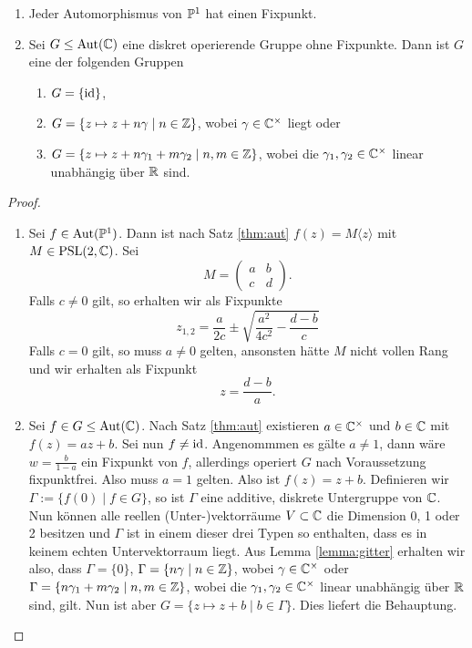 \begin{lemma}
  \label{lemma:deck-pc}
  \begin{enumerate}
  \item Jeder Automorphismus von $\P^1$ hat einen Fixpunkt.
  \item Sei $G \leq \Aut(\C)$ eine diskret operierende Gruppe ohne
    Fixpunkte. Dann ist $G$ eine der folgenden Gruppen
    \begin{enumerate}
    \item $G = \{\id\}$,
    \item $G = \{ z \mapsto z + n \gamma \mid n \in \Z\}$, wobei $\gamma
      \in \C^\times$ liegt oder
    \item $G = \{z \mapsto z + n \gamma_1 + m \gamma_2 \mid n,m \in
      \Z\}$, wobei die $\gamma_1, \gamma_2 \in \C^\times$ linear
      unabhängig über $\R$ sind.
    \end{enumerate}
  \end{enumerate}
\end{lemma}

\begin{proof}
  \begin{enumerate}
  \item Sei $f \in \Aut(\P^1)$. Dann ist nach Satz \ref{thm:aut} $f(z) = M\langle z \rangle$ mit $M
    \in \PSL(2, \C)$. Sei
    \[
    M =
    \begin{pmatrix}
      a & b \\
      c & d
    \end{pmatrix}.
    \]
    Falls $c \neq 0$ gilt, so erhalten wir als Fixpunkte
    \[
    z_{1,2} = \frac{a}{2c} \pm \sqrt{\frac{a^2}{4 c^2} - \frac{d-b}{c}}
    \]
    Falls $c = 0$ gilt, so muss $a \neq 0$ gelten, ansonsten hätte $M$ nicht
    vollen Rang und wir erhalten als Fixpunkt
    \[
    z = \frac{d-b}{a}.
    \]
  \item Sei $f \in G \leq \Aut(\C)$. Nach Satz \ref{thm:aut}
    existieren $a \in \C^\times$ und $b \in \C$ mit $f(z) = az
    +b$. Sei nun $f \neq \id$. Angenommmen es gälte $a \neq 1$, dann
    wäre $w = \frac{b}{1-a}$ ein Fixpunkt von $f$, allerdings operiert
    $G$ nach Voraussetzung fixpunktfrei. Also muss $a = 1$
    gelten. Also ist $f(z) = z + b$. Definieren wir $\Gamma := \{f(0) \mid
    f \in G\}$, so ist $\Gamma$ eine additive, diskrete Untergruppe
    von $\C$. Nun können alle reellen (Unter-)vektorräume $V \subset
    \C$ die Dimension 0, 1 oder 2 besitzen und $\Gamma$ ist in einem
    dieser drei Typen so enthalten, dass es in keinem echten
    Untervektorraum liegt. Aus Lemma \ref{lemma:gitter} erhalten wir
    also, dass $\Gamma = \{0\}$, $\Gamma = \{ n \gamma \mid n \in \Z\}$,
    wobei $\gamma \in \C^\times$ oder $\Gamma = \{n \gamma_1 + m
    \gamma_2 \mid n,m \in \Z \}$, wobei die $\gamma_1, \gamma_2 \in
    \C^\times$ linear unabhängig über $\R$ sind, gilt. Nun ist aber $G
    = \{z \mapsto z + b \mid b \in \Gamma \}$. Dies liefert die Behauptung.
  \end{enumerate}
\end{proof}

